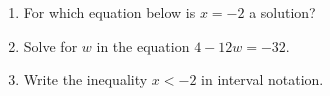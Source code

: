 \documentclass{article}
\begin{document}
\begin{enumerate}
        \begin{enumerate}
        \end{enumerate}



\item For which equation below is $x=-2$ a solution?

        \begin{enumerate}
        \end{enumerate}


\item Solve for $w$ in the equation  \(4-12w=-32 \).

        \begin{enumerate}
        \end{enumerate}


\item Write the inequality $x<-2$ in interval notation. 

        \begin{enumerate}
        \end{enumerate}


\end{enumerate}
\end{document}
